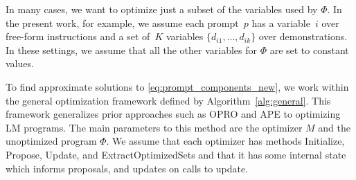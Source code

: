In many cases, we want to optimize just a subset of the variables used by $\Phi$. In the present work, for example, we assume each prompt~$p$ has a variable~$i$ over free-form instructions and a set of~$K$ variables $\{d_{i1}, \ldots, d_{ik}\}$ over demonstrations. In these settings, we assume that all the other variables for $\Phi$ are set to constant values.

To find approximate solutions to \eqref{eq:prompt_components_new}, we work within the general optimization framework defined by Algorithm~\ref{alg:general}.  This framework generalizes prior approaches such as OPRO \citep{yang2023large} and APE \citep{zhou2022large} to optimizing LM programs. The main parameters to this method are the optimizer $M$ and the unoptimized program $\Phi$. We assume that each optimizer has methods Initialize, Propose, Update, and ExtractOptimizedSets and that it has some internal state which informs proposals, and updates on calls to update. 


